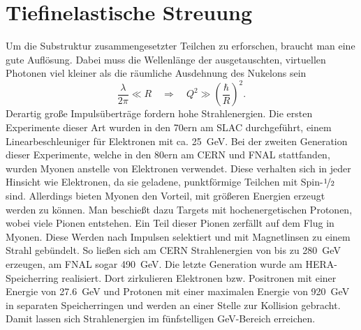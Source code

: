 \chapter{Tiefinelastische Streuung}
Um die Substruktur zusammengesetzter Teilchen zu erforschen, braucht man eine gute Auflösung.
Dabei muss die Wellenlänge der ausgetauschten, virtuellen Photonen viel kleiner als die räumliche Ausdehnung des Nukelons sein
\begin{equation*}
	\frac{\lambda}{2\pi}\ll R\quad\Rightarrow\quad Q^2 \gg \left(\frac{\hbar}{R}\right)^2.
\end{equation*}
Derartig große Impulsüberträge fordern hohe Strahlenergien.
Die ersten Experimente dieser Art wurden in den 70ern am SLAC durchgeführt, einem Linearbeschleuniger für Elektronen mit ca. \SI{25}{\GeV}.
Bei der zweiten Generation dieser Experimente, welche in den 80ern am CERN und FNAL stattfanden, wurden Myonen anstelle von Elektronen verwendet.
Diese verhalten sich in jeder Hinsicht wie Elektronen, da sie geladene, punktförmige Teilchen mit Spin-$\nicefrac{1}{2}$ sind.
Allerdings bieten Myonen den Vorteil, mit größeren Energien erzeugt werden zu können.
Man beschießt dazu Targets mit hochenergetischen Protonen, wobei viele Pionen entstehen.
Ein Teil dieser Pionen zerfällt auf dem Flug in Myonen.
Diese Werden nach Impulsen selektiert und mit Magnetlinsen zu einem Strahl gebündelt.
So ließen sich am CERN Strahlenergien von bis zu \SI{280}{\GeV} erzeugen, am FNAL sogar \SI{490}{\GeV}.
Die letzte Generation wurde am HERA-Speicherring realisiert.
Dort zirkulieren Elektronen bzw. Positronen mit einer Energie von \SI{27.6}{\GeV} und Protonen mit einer maximalen Energie von \SI{920}{\GeV} in separaten Speicherringen und werden an einer Stelle zur Kollision gebracht.
Damit lassen sich Strahlenergien im fünfstelligen \si{\GeV}-Bereich erreichen.
